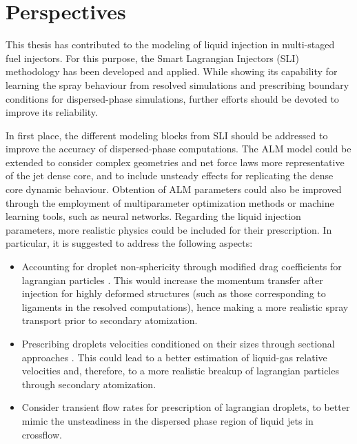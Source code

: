 \clearpage



\section*{Perspectives}

This thesis has contributed to the modeling of liquid injection in multi-staged fuel injectors. For this purpose, the Smart Lagrangian Injectors (SLI) methodology has been developed and applied. While showing its capability for learning the spray behaviour from resolved simulations and prescribing boundary conditions for dispersed-phase simulations, further efforts should be devoted to improve its reliability. 

In first place, the different modeling blocks from SLI should be addressed to improve the accuracy of dispersed-phase computations. The ALM model could be extended to consider complex geometries and net force laws more representative of the jet dense core, and to include unsteady effects for replicating the dense core dynamic behaviour. Obtention of ALM parameters could also be improved through the employment of multiparameter optimization methods or machine learning tools, such as neural networks. Regarding the liquid injection parameters, more realistic physics could be included for their prescription. In particular, it is suggested to address the following aspects:

\begin{itemize}
	
		\item Accounting for droplet non-sphericity through modified drag coefficients for lagrangian particles . This would increase the momentum transfer after injection for highly deformed structures (such as those corresponding to ligaments in the resolved computations), hence making a more realistic spray transport prior to secondary atomization. 
		
		\item Prescribing droplets velocities conditioned on their sizes through sectional approaches . This could lead to a better estimation of liquid-gas relative velocities and, therefore, to a more realistic breakup of lagrangian particles through secondary atomization.
		
		\item Consider transient flow rates for prescription of lagrangian droplets, to better mimic the unsteadiness in the dispersed phase region of liquid jets in crossflow.
	
\end{itemize}

